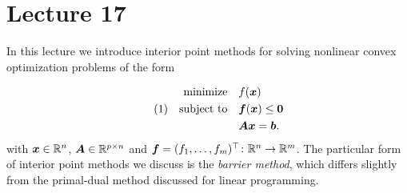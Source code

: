 %
%
% 


\chapter*{Lecture 17}
\addtocounter{chapter}{17}
\addtocounter{section}{0}


In this lecture we introduce interior point methods for solving nonlinear convex optimization problems of the form

\begin{align}\label{eq:constr}\tag{1}
\begin{split}
 \text{minimize}\quad & f(\bm{x})\\
 \quad\text{subject to}\quad & \bm{f}(\bm{x})\leq \bm{0}\\
         & \bm{A}\bm{x} = \bm{b}.
\end{split}
\end{align}
with $\bm{x}\in \mathbb{R}^n$, $\bm{A}\in \mathbb{R}^{p\times n}$ and $\bm{f}=(f_1,\dots,f_m)^{\top}\colon \mathbb{R}^n\to \mathbb{R}^m$. The particular form of interior point methods we discuss is the {\em barrier method}, which differs slightly from the primal-dual method discussed for linear programming.

